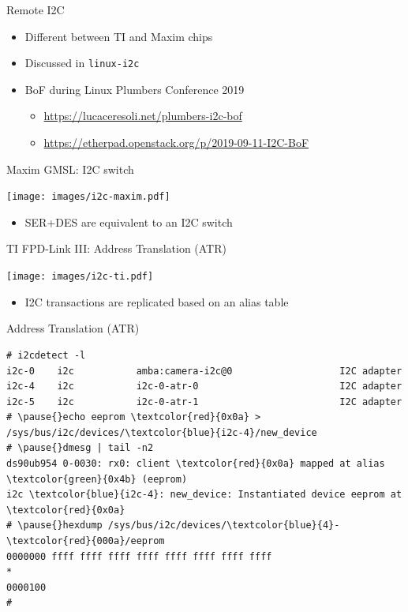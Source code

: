 \documentclass[xetex,table,aspectratio=169]{beamer}
\begin{document}
\begin{frame}{Remote I2C}
  \begin{itemize}
  \item Different between TI and Maxim chips
  \item Discussed in {\tt linux-i2c}
  \item BoF during Linux Plumbers Conference 2019
    \begin{itemize}
    \item \url{https://lucaceresoli.net/plumbers-i2c-bof}
    \item \url{https://etherpad.openstack.org/p/2019-09-11-I2C-BoF}
    \end{itemize}
  \end{itemize}
\end{frame}

\begin{frame}{Maxim GMSL: I2C switch}
  \begin{center}
    \texttt{[image: images/i2c-maxim.pdf]}
  \end{center}

  \begin{itemize}
  \item SER+DES are equivalent to an I2C switch
  \end{itemize}
\end{frame}

\begin{frame}{TI FPD-Link III: Address Translation (ATR)}
  \begin{center}
    \texttt{[image: images/i2c-ti.pdf]}
  \end{center}

  \begin{itemize}
  \item I2C transactions are replicated based on an alias table
  \end{itemize}
\end{frame}

\begin{frame}[fragile]{Address Translation (ATR)}
  \begin{Verbatim}[commandchars=\\\{\}]
# i2cdetect -l
i2c-0    i2c           amba:camera-i2c@0                   I2C adapter
i2c-4    i2c           i2c-0-atr-0                         I2C adapter
i2c-5    i2c           i2c-0-atr-1                         I2C adapter
# \pause{}echo eeprom \textcolor{red}{0x0a} > /sys/bus/i2c/devices/\textcolor{blue}{i2c-4}/new_device
# \pause{}dmesg | tail -n2
ds90ub954 0-0030: rx0: client \textcolor{red}{0x0a} mapped at alias \textcolor{green}{0x4b} (eeprom)
i2c \textcolor{blue}{i2c-4}: new_device: Instantiated device eeprom at \textcolor{red}{0x0a}
# \pause{}hexdump /sys/bus/i2c/devices/\textcolor{blue}{4}-\textcolor{red}{000a}/eeprom
0000000 ffff ffff ffff ffff ffff ffff ffff ffff
*
0000100
#
  \end{Verbatim}
\end{frame}
\end{document}
